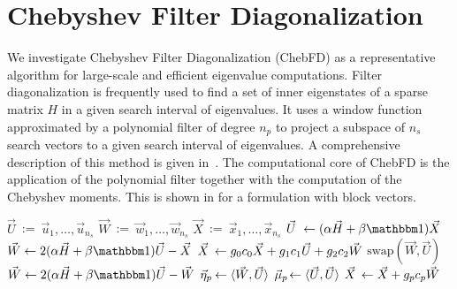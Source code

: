 \documentclass[letterpaper]{llncs}
\begin{document}
\section{Chebyshev Filter Diagonalization}
We investigate Chebyshev Filter Diagonalization (ChebFD) as a
representative algorithm for large-scale and efficient eigenvalue
computations. Filter diagonalization is frequently used to find a set
of inner eigenstates of a sparse matrix $H$ in a given search interval
of eigenvalues. It uses a window function approximated by a
polynomial filter of degree $n_p$ to project a subspace of $n_s$ search vectors to a given search interval of eigenvalues. A comprehensive description of this method is
given in~\cite{Pieper15ChebFD}. The computational core of
ChebFD is the application of the polynomial filter together with the
computation of the Chebyshev moments. This is shown in
 for a formulation with block vectors.
\begin{algorithm}[tb]
\caption{Application of the ChebFD polynomial filter to block vectors.}
\begin{algorithmic}[1]  
    \State $\vec U$\ :=\ $\vec u_1,\dots,\vec u_{n_s}$
    \State $\vec W$\ :=\ $\vec w_1,\dots,\vec w_{n_s}$
    \State $\vec X$\ :=\ $\vec x_1,\dots,\vec x_{n_s}$
    \State $\mathrlap{\vec U}\phantom{\vec W} \gets (\alpha\vec H + \beta \mathbbm
        1) \vec X$ 
    \State $\vec W \gets 2 (\alpha\vec H + \beta \mathbbm 1) \vec U - \vec X$
    \State $\mathrlap{\vec X}\phantom{\vec W} \gets g_0 c_0 \vec X + g_1 c_1
    \vec U + g_2 c_2 \vec W$ 
    \State $\mbox{swap} ( \vec W ,  \vec U )$
    \State $\vec W \gets 2 (\alpha\vec H + \beta \mathbbm 1) \vec U -  \vec W$ 
    \State $\mathrlap{\vec \eta_p}\phantom{\vec X} \gets \langle \vec W, \vec U \rangle$ 
    \State $\mathrlap{\vec \mu_p}\phantom{\vec X} \gets \langle \vec U, \vec U \rangle$ 
    \hfill{}
    \State $\mathrlap{\vec X}\phantom{\vec W} \gets \vec X + g_p c_p \vec W$ 
    \EndFor
\end{algorithmic}
\label{alg:chebfd_vanilla}
\end{algorithm}
\end{document}

